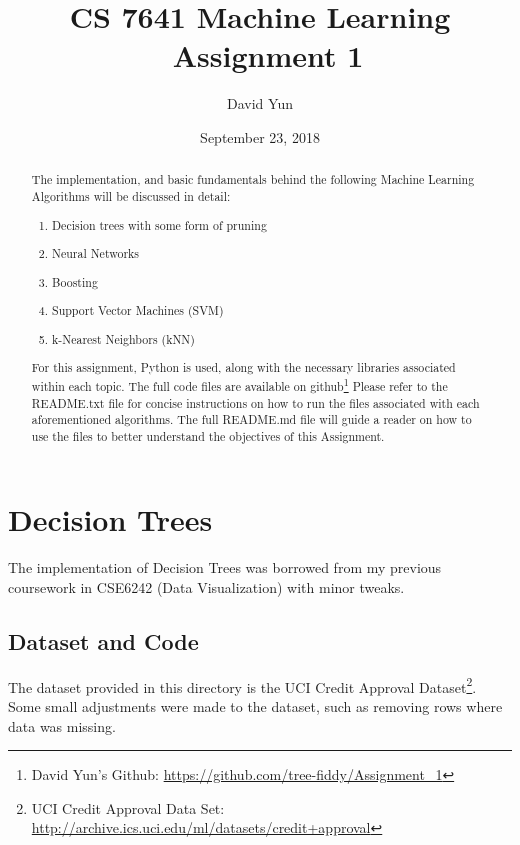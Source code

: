 \documentclass[letterpaper,12pt]{article}
\begin{document}
\title{CS 7641 Machine Learning \\
		\ Assignment 1 }
\author{David Yun}
\date{September 23, 2018}
\maketitle

\begin{abstract}
  The implementation, and basic fundamentals behind the following Machine Learning Algorithms will be discussed in detail:  
  \begin{enumerate}
    \item Decision trees with some form of pruning
    \item Neural Networks
    \item Boosting
    \item Support Vector Machines (SVM)
    \item k-Nearest Neighbors (kNN)
      
    \end{enumerate}

    For this assignment, Python is used, along with the necessary libraries associated within each topic.  The full code files are available on github\footnote{David Yun's Github: \url{https://github.com/tree-fiddy/Assignment_1}}
    Please refer to the README.txt file for concise instructions on how to run the files associated with each aforementioned algorithms.  The full README.md file will guide a reader on how to use the files to better understand the objectives of this Assignment.  

\end{abstract}

\tableofcontents

\section{Decision Trees}

The implementation of Decision Trees was borrowed from my previous coursework in CSE6242 (Data Visualization) with minor tweaks.  

\subsection{Dataset and Code}
The dataset provided in this directory is the UCI Credit Approval Dataset\footnote{UCI Credit Approval Data Set: \url{http://archive.ics.uci.edu/ml/datasets/credit+approval}}.  Some small adjustments were made to the dataset, such as removing rows where data was missing.  
\end{document}
